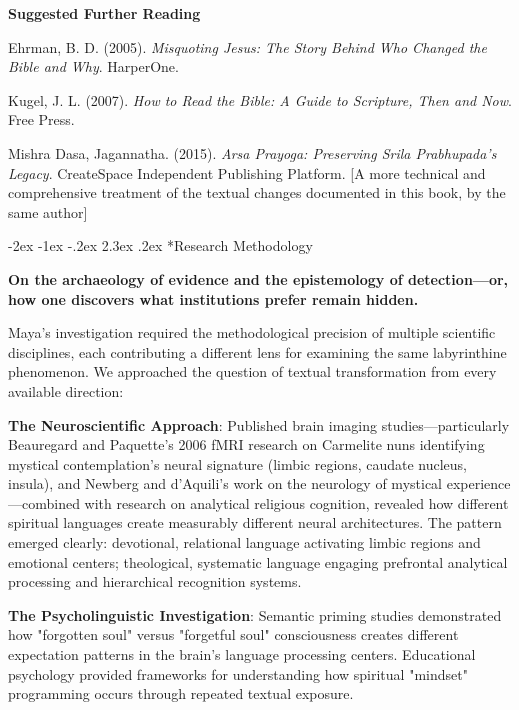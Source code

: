 \documentclass[12pt,twoside]{book}
\makeatletter
\def\cleardoublepage{\clearpage\if@twoside \ifodd\c@page\else\hbox{}\thispagestyle{empty}\newpage\if@twocolumn\hbox{}\newpage\fi\fi\fi}
\renewcommand\section{\@startsection{section}{1}{\z@}%
{-2ex \@plus -1ex \@minus -.2ex}%
{2.3ex \@plus.2ex}%
{\normalfont\Large\bfseries}}
\makeatother
\begin{document}
\vspace{0.5cm}

\textbf{\textbf{Suggested Further Reading}}

Ehrman, B. D. (2005). \emph{Misquoting Jesus: The Story Behind Who Changed the Bible and Why}. HarperOne.

Kugel, J. L. (2007). \emph{How to Read the Bible: A Guide to Scripture, Then and Now}. Free Press.

Mishra Dasa, Jagannatha. (2015). \emph{Arsa Prayoga: Preserving Srila Prabhupada's Legacy}. CreateSpace Independent Publishing Platform.
{[}A more technical and comprehensive treatment of the textual changes documented in this book, by the same author]

\cleardoublepage
\section*{Research Methodology}
\thispagestyle{sectionopening}

\textbf{On the archaeology of evidence and the epistemology of detection—or, how one discovers what institutions prefer remain hidden.}

Maya's investigation required the methodological precision of multiple scientific disciplines, each contributing a different lens for examining the same labyrinthine phenomenon. We approached the question of textual transformation from every available direction:

\textbf{\textbf{The Neuroscientific Approach}}: Published brain imaging studies—particularly Beauregard and Paquette's 2006 fMRI research on Carmelite nuns identifying mystical contemplation's neural signature (limbic regions, caudate nucleus, insula), and Newberg and d'Aquili's work on the neurology of mystical experience—combined with research on analytical religious cognition, revealed how different spiritual languages create measurably different neural architectures. The pattern emerged clearly: devotional, relational language activating limbic regions and emotional centers; theological, systematic language engaging prefrontal analytical processing and hierarchical recognition systems.

\textbf{\textbf{The Psycholinguistic Investigation}}: Semantic priming studies demonstrated how "forgotten soul" versus "forgetful soul" consciousness creates different expectation patterns in the brain's language processing centers. Educational psychology provided frameworks for understanding how spiritual "mindset" programming occurs through repeated textual exposure.
\end{document}
